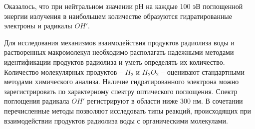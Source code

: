 \documentclass[a4paper, 14pt]{article}
\begin{document}
Оказалось, что при нейтральном значении рН на каждые 100 эВ поглощенной энергии излучения в наибольшем количестве образуются гидратированные электроны и радикалы $OH'$. 

Для исследования механизмов взаимодействия продуктов радиолиза воды и растворенных макромолекул необходимо располагать надежными методами идентификации продуктов радиолиза и уметь определять их количество. Количество молекулярных продуктов – $H_2$ и $H_2O_2$ – оценивают стандартными методами химического анализа. Наличие гидратированного электрона можно зарегистрировать по характерному спектру оптического поглощения. Спектр поглощения радикала $OH'$ регистрируют в области ниже 300 нм. В сочетании перечисленные методы позволяют исследовать типы реакций, происходящих при взаимодействии продуктов радиолиза воды с органическими молекулами. 

\end{document}
